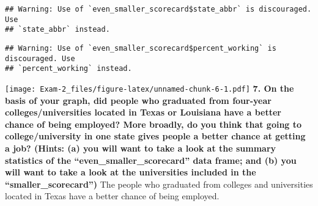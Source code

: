\documentclass[
]{article}
\newenvironment{Shaded}{\begin{snugshade}}{\end{snugshade}}
\newcommand{\AttributeTok}[1]{\textcolor[rgb]{0.77,0.63,0.00}{#1}}
\newcommand{\DecValTok}[1]{\textcolor[rgb]{0.00,0.00,0.81}{#1}}
\newcommand{\FunctionTok}[1]{\textcolor[rgb]{0.00,0.00,0.00}{#1}}
\newcommand{\NormalTok}[1]{#1}
\newcommand{\OtherTok}[1]{\textcolor[rgb]{0.56,0.35,0.01}{#1}}
\newcommand{\SpecialCharTok}[1]{\textcolor[rgb]{0.00,0.00,0.00}{#1}}
\newcommand{\StringTok}[1]{\textcolor[rgb]{0.31,0.60,0.02}{#1}}
\begin{document}
\begin{Shaded}
\end{Shaded}

\begin{verbatim}
## Warning: Use of `even_smaller_scorecard$state_abbr` is discouraged. Use
## `state_abbr` instead.
\end{verbatim}

\begin{verbatim}
## Warning: Use of `even_smaller_scorecard$percent_working` is discouraged. Use
## `percent_working` instead.
\end{verbatim}

\texttt{[image: Exam-2\_files/figure-latex/unnamed-chunk-6-1.pdf]}
\textbf{7. On the basis of your graph, did people who graduated from
four-year colleges/universities located in Texas or Louisiana have a
better chance of being employed? More broadly, do you think that going
to college/university in one state gives people a better chance at
getting a job? (Hints: (a) you will want to take a look at the summary
statistics of the ``even\_smaller\_scorecard'' data frame; and (b) you
will want to take a look at the universities included in the
``smaller\_scorecard'')} The people who graduated from colleges and
universities located in Texas have a better chance of being employed.
\end{document}
